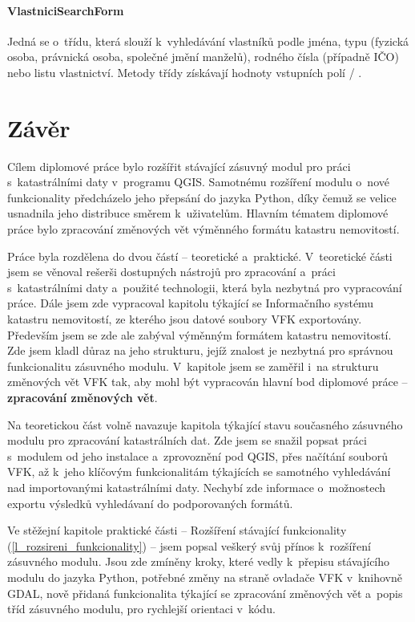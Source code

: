 \documentclass[a4paper,12pt,oneside]{book}
\begin{document}
\subsubsection{VlastniciSearchForm}
Jedná se o~třídu, která slouží k~vyhledávání vlastníků podle jména, typu (fyzická osoba, právnická osoba, společné jmění manželů), rodného čísla (případně IČO) nebo listu vlastnictví. Metody třídy získávají hodnoty vstupních polí / .


\clearpage
{}       %
\chapter*{Závěr}

Cílem diplomové práce bylo rozšířit stávající zásuvný modul pro práci s~katastrálními daty v~programu QGIS. Samotnému rozšíření modulu o~nové funkcionality předcházelo jeho přepsání do jazyka Python, díky čemuž se velice usnadnila jeho distribuce směrem k~uživatelům. Hlavním tématem diplomové práce bylo zpracování změnových vět výměnného formátu katastru nemovitostí. 

Práce byla rozdělena do dvou částí -- teoretické a~praktické. V~teoretické části jsem se věnoval rešerši dostupných nástrojů pro zpracování a~práci s~katastrálními daty a~použité technologii, která byla nezbytná pro vypracování práce. Dále jsem zde vypracoval kapitolu týkající se Informačního systému katastru nemovitostí, ze kterého jsou datové soubory VFK exportovány. Především jsem se zde ale zabýval výměnným formátem katastru nemovitostí. Zde jsem kladl důraz na jeho strukturu, jejíž znalost je nezbytná pro správnou funkcionalitu zásuvného modulu. V~kapitole jsem se zaměřil i~na strukturu změnových vět VFK tak, aby mohl být vypracován hlavní bod diplomové práce -- \textbf{zpracování změnových vět}.

Na teoretickou část volně navazuje kapitola týkající stavu současného zásuvného modulu pro zpracování katastrálních dat. Zde jsem se snažil popsat práci s~modulem od jeho instalace a~zprovoznění pod QGIS, přes načítání souborů VFK, až k~jeho klíčovým funkcionalitám týkajících se samotného vyhledávání nad importovanými katastrálními daty. Nechybí zde informace o~možnostech exportu výsledků vyhledávaní do podporovaných formátů.

Ve stěžejní kapitole praktické části -- Rozšíření stávající funkcionality (\ref{l_rozsireni_funkcionality}) -- jsem popsal veškerý svůj přínos k~rozšíření zásuvného modulu. Jsou zde zmíněny kroky, které vedly k~přepisu stávajícího modulu do jazyka Python, potřebné změny na straně ovladače VFK v~knihovně GDAL, nově přidaná funkcionalita týkající se zpracování změnových vět a~popis tříd zásuvného modulu, pro rychlejší orientaci v~kódu.
\end{document}
